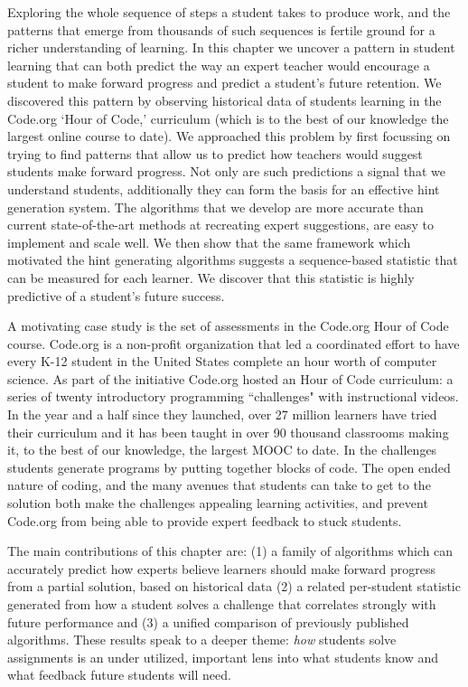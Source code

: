 Exploring the whole sequence of steps a student takes to produce work, and the patterns that emerge from thousands of such sequences is fertile ground for a richer understanding of learning. In this chapter we uncover a pattern in student learning that can both predict the way an expert teacher would encourage a student to make forward progress and predict a student's future retention. We discovered this pattern by observing historical data of students learning in the Code.org `Hour of Code,' curriculum (which is to the best of our knowledge the largest online course to date). We approached this problem by first focussing on trying to find patterns that allow us to predict how teachers would suggest students make forward progress. Not only are such predictions a signal that we understand students, additionally they can form the basis for an effective hint generation system. The algorithms that we develop are more accurate than current state-of-the-art methods at recreating expert suggestions, are easy to implement and scale well. We then show that the same framework which motivated the hint generating algorithms suggests a sequence-based statistic that can be measured for each learner. We discover that this statistic is highly predictive of a student's future success. 

A motivating case study is the set of assessments in the Code.org Hour of Code course. Code.org is a non-profit organization that led a coordinated effort to have every K-12 student in the United States complete an hour worth of computer science. As part of the initiative Code.org hosted an Hour of Code curriculum: a series of twenty introductory programming ``challenges" with instructional videos. In the year and a half since they launched, over 27 million learners have tried their curriculum and it has been taught in over 90 thousand classrooms making it, to the best of our knowledge, the largest MOOC to date. In the challenges students generate programs by putting together blocks of code. The open ended nature of coding, and the many avenues that students can take to get to the solution both make the challenges appealing learning activities, and prevent Code.org from being able to provide expert feedback to stuck students. 

The main contributions of this chapter are:
(1) a family of algorithms which can accurately predict how experts believe learners should make forward progress from a partial solution, based on historical data (2) a related per-student statistic generated from how a student solves a challenge that correlates strongly with future performance and (3) a unified comparison of previously published algorithms. These results speak to a deeper theme: \emph{how} students solve assignments is an under utilized, important lens into what students know and what feedback future students will need.

